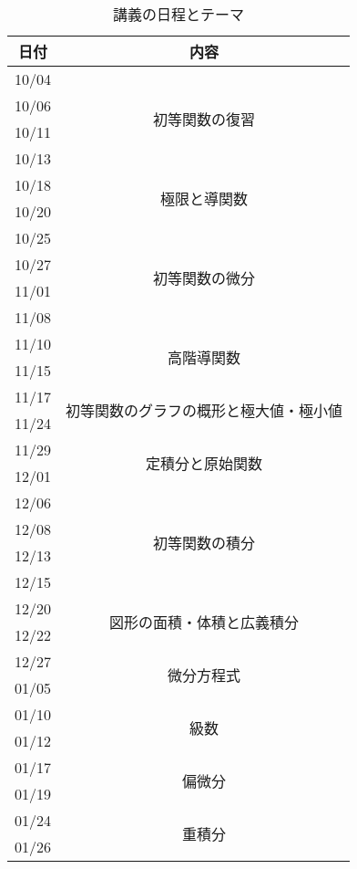 \begin{table}[!h]
	\centering
	\caption{講義の日程とテーマ}
	\label{table:schedule}
	\begin{tabular}{c|c}
		日付 & 内容 \\
		\hline
		10/04 & \multirow{4}{*}{初等関数の復習} \\
		10/06 & \\
		10/11 & \\
		10/13 & \\
		\hline
		10/18 & \multirow{2}{*}{極限と導関数} \\
		10/20 & \\
		\hline
		10/25 & \multirow{4}{*}{初等関数の微分} \\
		10/27 & \\
		11/01 & \\
		11/08 & \\
		\hline
		11/10 & \multirow{2}{*}{高階導関数} \\
		11/15 & \\
		\hline
		11/17 & \multirow{2}{*}{初等関数のグラフの概形と極大値・極小値} \\
		11/24 & \\
		\hline
		11/29 & \multirow{2}{*}{定積分と原始関数} \\
		12/01 & \\
		\hline
		12/06 & \multirow{4}{*}{初等関数の積分} \\
		12/08 & \\
		12/13 & \\
		12/15 & \\
		\hline
		12/20 & \multirow{2}{*}{図形の面積・体積と広義積分} \\
		12/22 & \\
		\hline
		12/27 & \multirow{2}{*}{微分方程式} \\
		01/05 & \\
		\hline
		01/10 & \multirow{2}{*}{級数} \\
		01/12 & \\
		\hline
		01/17 & \multirow{2}{*}{偏微分} \\
		01/19 & \\
		\hline
		01/24 & \multirow{2}{*}{重積分} \\
		01/26 & \\
	\end{tabular}
\end{table}
